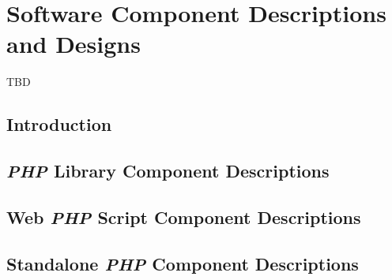 
\chapter{Software Component Descriptions and Designs}

\label{csco0}

                  {TBD}


\section{Introduction}
\label{csco0:sint0}


\section{\emph{PHP} Library Component Descriptions}
\label{csco0:sphp0}


\section{Web \emph{PHP} Script Component Descriptions}
\label{csco0:spsw0}


\section{Standalone \emph{PHP} Component Descriptions}
\label{csco0:ssph0}


